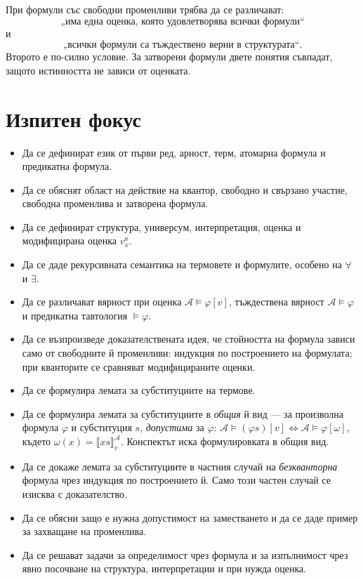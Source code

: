 \begin{supp}[Бележка]
При формули със свободни променливи трябва да се различават:
\[
\text{„има една оценка, която удовлетворява всички формули“}
\]
и
\[
\text{„всички формули са тъждествено верни в структурата“}.
\]
Второто е по-силно условие. За затворени формули двете понятия съвпадат, защото истинността не зависи от оценката.
\end{supp}

\section{Изпитен фокус}\label{s:21.6}

\begin{itemize}
\item Да се дефинират език от първи ред, арност, терм, атомарна формула и предикатна формула.
\item Да се обяснят област на действие на квантор, свободно и свързано участие, свободна променлива и затворена формула.
\item Да се дефинират структура, универсум, интерпретация, оценка и модифицирана оценка $v_x^a$.
\item Да се даде рекурсивната семантика на термовете и формулите, особено на $\forall$ и $\exists$.
\item Да се различават вярност при оценка $\mathcal A\models\varphi[v]$, тъждествена вярност $\mathcal A\models\varphi$ и предикатна тавтология $\models\varphi$.
\item Да се възпроизведе доказателствената идея, че стойността на формула зависи само от свободните й променливи: индукция по построението на формулата; при кванторите се сравняват модифицираните оценки.
\item Да се формулира лемата за субституциите на термове.
\item Да се формулира лемата за субституциите в \emph{общия} й вид --- за произволна формула $\varphi$ и субституция $s$, \emph{допустима} за $\varphi$: $\mathcal A\models(\varphi s)[v]\Leftrightarrow\mathcal A\models\varphi[\omega]$, където $\omega(x)=\llbracket xs\rrbracket^{\mathcal A}_v$. Конспектът иска формулировката в общия вид.
\item Да се докаже лемата за субституциите в частния случай на \emph{безкванторна} формула чрез индукция по построението й. Само този частен случай се изисква с доказателство.
\item Да се обясни защо е нужна допустимост на заместването и да се даде пример за захващане на променлива.
\item Да се решават задачи за определимост чрез формула и за изпълнимост чрез явно посочване на структура, интерпретации и при нужда оценка.
\end{itemize}

